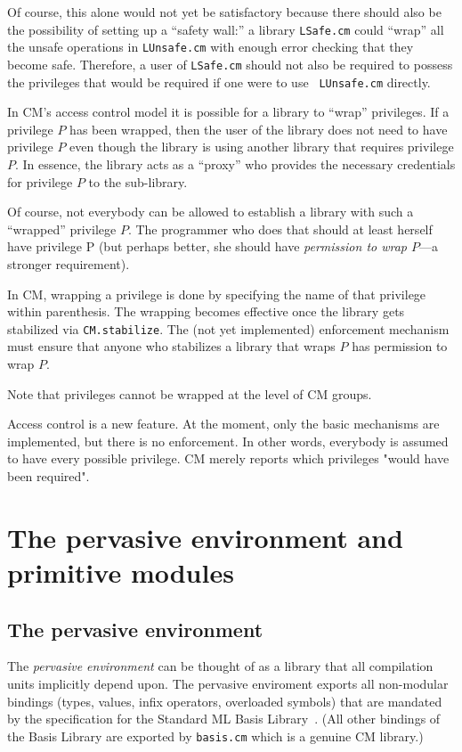 \documentclass{article}
\begin{document}
Of course, this alone would not yet be satisfactory because there
should also be the possibility of setting up a ``safety wall:'' a
library {\tt LSafe.cm} could ``wrap'' all the unsafe operations in
{\tt LUnsafe.cm} with enough error checking that they become safe.
Therefore, a user of {\tt LSafe.cm} should not also be required to
possess the privileges that would be required if one were to use {\tt
LUnsafe.cm} directly.

In CM's access control model it is possible for a library to ``wrap''
privileges.  If a privilege $P$ has been wrapped, then the user of the
library does not need to have privilege $P$ even though the library is
using another library that requires privilege $P$.  In essence, the
library acts as a ``proxy'' who provides the necessary credentials for
privilege $P$ to the sub-library.

Of course, not everybody can be allowed to establish a library with
such a ``wrapped'' privilege $P$.  The programmer who does that should at
least herself have privilege P (but perhaps better, she should have
{\em permission to wrap $P$}---a stronger requirement).

In CM, wrapping a privilege is done by specifying the name of that
privilege within parenthesis.  The wrapping becomes effective once the
library gets stabilized via {\tt CM.stabilize}.  The (not yet
implemented) enforcement mechanism must ensure that anyone who
stabilizes a library that wraps $P$ has permission to wrap $P$.

Note that privileges cannot be wrapped at the level of CM groups.

Access control is a new feature. At the moment, only the basic
mechanisms are implemented, but there is no enforcement.  In other
words, everybody is assumed to have every possible privilege.  CM
merely reports which privileges "would have been required".

\section{The pervasive environment and primitive modules}

\subsection{The pervasive environment}

The {\em pervasive environment} can be thought of as a library that
all compilation units implicitly depend upon.  The pervasive
enviroment exports all non-modular bindings (types, values, infix
operators, overloaded symbols) that are mandated by the specification
for the Standard ML Basis Library~\cite{reppy99:basis}.  (All other
bindings of the Basis Library are exported by {\tt basis.cm} which is
a genuine CM library.)
\end{document}

